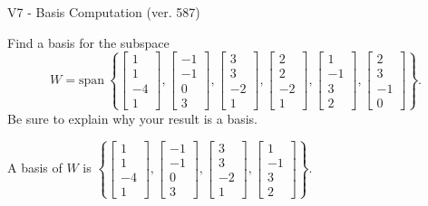 \begin{exercise}
  \begin{exerciseTitle}V7 - Basis Computation (ver. 587)\end{exerciseTitle}
  \begin{exerciseStatement}
    Find a basis for the subspace 
\[W=\mathrm{span}\ \left\{\left[\begin{array}{r}
1 \\
1 \\
-4 \\
1
\end{array}\right] , \left[\begin{array}{r}
-1 \\
-1 \\
0 \\
3
\end{array}\right] , \left[\begin{array}{r}
3 \\
3 \\
-2 \\
1
\end{array}\right] , \left[\begin{array}{r}
2 \\
2 \\
-2 \\
1
\end{array}\right] , \left[\begin{array}{r}
1 \\
-1 \\
3 \\
2
\end{array}\right] , \left[\begin{array}{r}
2 \\
3 \\
-1 \\
0
\end{array}\right]\right\}.\]
 Be sure to explain why your result is a basis.


  \end{exerciseStatement}
  \begin{exerciseAnswer}
   A basis of \(W\) is  \(\left\{\left[\begin{array}{r}
1 \\
1 \\
-4 \\
1
\end{array}\right] , \left[\begin{array}{r}
-1 \\
-1 \\
0 \\
3
\end{array}\right] , \left[\begin{array}{r}
3 \\
3 \\
-2 \\
1
\end{array}\right] , \left[\begin{array}{r}
1 \\
-1 \\
3 \\
2
\end{array}\right]\right\}\).
  


  \end{exerciseAnswer}
\end{exercise}